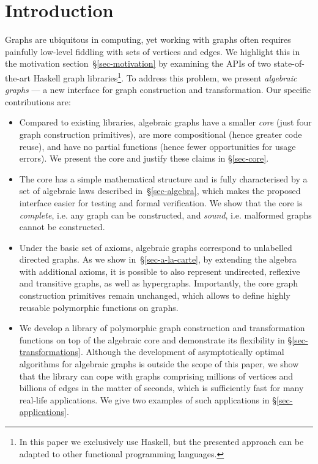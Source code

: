 \section{Introduction}

Graphs are ubiquitous in computing, yet working with graphs often requires
painfully low-level fiddling with sets of vertices and edges. We highlight this
in the motivation section~\S\ref{sec-motivation} by examining the APIs of
two state-of-the-art Haskell graph libraries\footnote{In this paper we exclusively
use Haskell, but the presented approach can be adapted to other functional
programming languages.}. To address this problem, we present
\emph{algebraic graphs} --- a new interface for graph construction and
transformation. Our specific contributions are:

\begin{itemize}
  \item Compared to existing libraries, algebraic graphs have a smaller
  \emph{core} (just four graph construction primitives), are more compositional
  (hence greater code reuse), and have no partial functions (hence fewer
  opportunities for usage errors). We present the core and justify these claims
  in \S\ref{sec-core}.

  \item The core has a simple mathematical structure and is fully characterised
  by a set of algebraic laws described in~\S\ref{sec-algebra}, which makes the
  proposed interface easier for testing and formal verification. We show that
  the core is \emph{complete}, i.e. any graph can be constructed, and \emph{sound},
  i.e. malformed graphs cannot be constructed.

  \item Under the basic set of axioms, algebraic graphs correspond to unlabelled
  directed graphs. As we show in~\S\ref{sec-a-la-carte}, by extending the algebra
  with additional axioms, it is possible to also represent undirected, reflexive
  and transitive graphs, as well as hypergraphs. Importantly, the core
  graph construction primitives remain unchanged, which allows to define highly
  reusable polymorphic functions on graphs.

  \item We develop a library of polymorphic graph construction and
  transformation functions on top of the algebraic core and demonstrate its
  flexibility in \S\ref{sec-transformations}.
  Although the development of asymptotically optimal algorithms for algebraic
  graphs is outside the scope of this paper, we show that the library can cope
  with graphs comprising millions of vertices and billions of edges in the
  matter of seconds, which is sufficiently fast for many real-life applications.
  We give two examples of such applications in \S\ref{sec-applications}.
\end{itemize}

